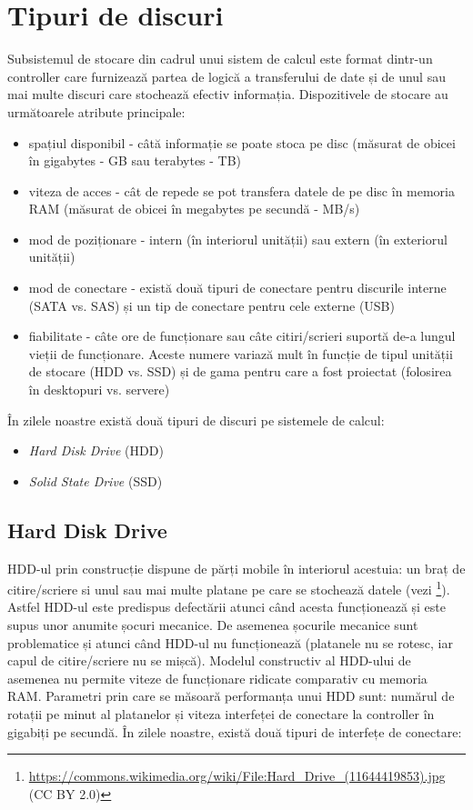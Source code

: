 \section{Tipuri de discuri}
\label{sec:storage:type}

Subsistemul de stocare din cadrul unui sistem de calcul este format dintr-un controller care furnizează partea de logică a transferului de date și de unul sau mai multe discuri care stochează efectiv informația.
Dispozitivele de stocare au următoarele atribute principale:

\begin{itemize}
  \item spațiul disponibil - câtă informație se poate stoca pe disc (măsurat de obicei în gigabytes - GB sau terabytes - TB)
  \item viteza de acces - cât de repede se pot transfera datele de pe disc în memoria RAM (măsurat de obicei în megabytes pe secundă - MB/s)
  \item mod de poziționare - intern (în interiorul unității) sau extern (în exteriorul unității)
  \item mod de conectare - există două tipuri de conectare pentru discurile interne (SATA vs. SAS) și un tip de conectare pentru cele externe (USB)
  \item fiabilitate - câte ore de funcționare sau câte citiri/scrieri suportă de-a lungul vieții de funcționare.
    Aceste numere variază mult în funcție de tipul unității de stocare (HDD vs. SSD) și de gama pentru care a fost proiectat (folosirea în desktopuri vs. servere)
\end{itemize}

În zilele noastre există două tipuri de discuri pe sistemele de calcul:

\begin{itemize}
  \item \textit{Hard Disk Drive} (HDD)
  \item \textit{Solid State Drive} (SSD)
\end{itemize}

\subsection{Hard Disk Drive}
\label{sec:storage:type:hdd}

HDD-ul prin construcție dispune de părți mobile în interiorul acestuia: un braț de citire/scriere si unul sau mai multe platane pe care se stochează datele (vezi \footnote{\url{https://commons.wikimedia.org/wiki/File:Hard\_Drive\_(11644419853).jpg} (CC BY 2.0)}).
Astfel HDD-ul este predispus defectării atunci când acesta funcționează și este supus unor anumite șocuri mecanice.
De asemenea șocurile mecanice sunt problematice și atunci când HDD-ul nu funcționează (platanele nu se rotesc, iar capul de citire/scriere nu se mișcă).
Modelul constructiv al HDD-ului de asemenea nu permite viteze de funcționare ridicate comparativ cu memoria RAM.
Parametri prin care se măsoară performanța unui HDD sunt: numărul de rotații pe minut al platanelor și viteza interfeței de conectare la controller în gigabiți pe secundă.
În zilele noastre, există două tipuri de interfețe de conectare:

